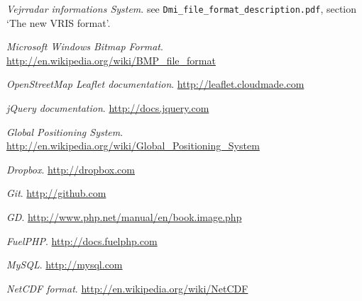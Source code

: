 \renewcommand\bibname{References}

\begin{thebibliography}{10}
\emph{Vejrradar informations System}.
see \texttt{Dmi\_file\_format\_description.pdf}, section `The new VRIS format'.

\emph{Microsoft Windows Bitmap Format}.
\url{http://en.wikipedia.org/wiki/BMP_file_format}

\emph{OpenStreetMap Leaflet documentation}.
\url{http://leaflet.cloudmade.com}

\emph{jQuery documentation}.
\url{http://docs.jquery.com}

\emph{Global Positioning System}.
\url{http://en.wikipedia.org/wiki/Global_Positioning_System}

\emph{Dropbox}.
\url{http://dropbox.com}

\emph{Git}.
\url{http://github.com}

\emph{GD}.
\url{http://www.php.net/manual/en/book.image.php}

\emph{FuelPHP}.
\url{http://docs.fuelphp.com}

\emph{MySQL}.
\url{http://mysql.com}

\emph{NetCDF format}.
\url{http://en.wikipedia.org/wiki/NetCDF}
\end{thebibliography}
